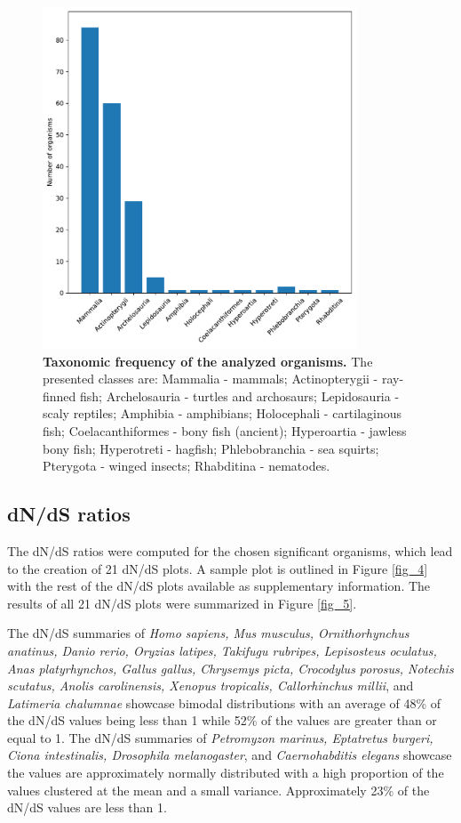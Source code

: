 \documentclass{article}
\begin{document}
\begin{figure}[]
\centering
\includegraphics[height=4in]{./images/taxa_info.pdf}
\caption{\textbf{Taxonomic frequency of the analyzed organisms.} The presented classes are: Mammalia - mammals; Actinopterygii - ray-finned fish; Archelosauria - turtles and archosaurs; Lepidosauria - scaly reptiles; Amphibia - amphibians; Holocephali - cartilaginous fish; Coelacanthiformes - bony fish (ancient); Hyperoartia - jawless bony fish; Hyperotreti - hagfish; Phlebobranchia - sea squirts; Pterygota - winged insects; Rhabditina - nematodes.}
\label{fig_2}
\end{figure}

\subsection{dN/dS ratios}

The dN/dS ratios were computed for the chosen significant organisms, which lead to the creation of 21 dN/dS plots. A sample plot is outlined in Figure \ref{fig_4} with the rest of the dN/dS plots available as supplementary information. The results of all 21 dN/dS plots were summarized in Figure \ref{fig_5}. 

The dN/dS summaries of \textit{Homo sapiens, Mus musculus, Ornithorhynchus anatinus, Danio rerio, Oryzias latipes, Takifugu rubripes, Lepisosteus oculatus, Anas platyrhynchos, Gallus gallus, Chrysemys picta, Crocodylus porosus, Notechis scutatus, Anolis carolinensis, Xenopus tropicalis, Callorhinchus millii}, and \textit{Latimeria chalumnae} showcase bimodal distributions with an average of 48\% of the dN/dS values being less than 1 while 52\% of the values are greater than or equal to 1. The dN/dS summaries of \textit{Petromyzon marinus, Eptatretus burgeri, Ciona intestinalis, Drosophila melanogaster}, and \textit{Caernohabditis elegans} showcase the values are approximately normally distributed with a high proportion of the values clustered at the mean and a small variance. Approximately 23\% of the dN/dS values are less than 1. 
\end{document}
